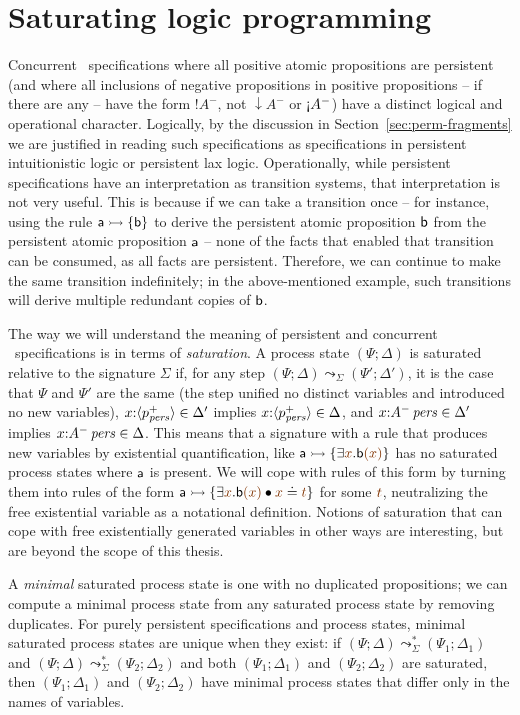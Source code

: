 \section{Saturating logic programming}

Concurrent \sls~specifications where all positive atomic propositions
are persistent (and where all inclusions of negative propositions in
positive propositions -- if there are any -- have the form ${!}A^-$, not
${\downarrow}A^-$ or ${\gnab}A^-$) have a distinct logical and
operational character. Logically, by the discussion in
Section~\ref{sec:perm-fragments} we are justified in reading such
specifications as specifications in persistent intuitionistic logic or
persistent lax logic. Operationally, while persistent specifications
have an interpretation as transition systems, that interpretation is
not very useful. This is because if we can take a transition once --
for instance, using the rule ${\sf a} \rightarrowtail \{ {\sf b} \}$ to derive
the persistent atomic proposition ${\sf b}$ from the persistent atomic
proposition ${\sf a}$ -- none of the facts that enabled that
transition can be consumed, as all facts are persistent. Therefore, we
can continue to make the same transition indefinitely; in the
above-mentioned example, such transitions will derive multiple
redundant copies of ${\sf b}$.

The way we will understand the meaning of persistent and concurrent
\sls~specifications is in terms of {\it saturation}. A process state
$(\Psi; \Delta)$ is saturated relative to the signature $\Sigma$ if,
for any step $(\Psi; \Delta) \leadsto_\Sigma (\Psi'; \Delta')$, it is
the case that $\Psi$ and $\Psi'$ are the same (the step unified no
distinct variables and introduced no new variables),
$x{:}\langle {p^+_{\it pers}} \rangle \in \Delta'$ implies $x{:}\langle {p^+_{\it pers}} \rangle \in
\Delta$, and $x{:}{A^-}\,{{\it pers}} \in \Delta'$ implies $x{:}{A^-}\,{{\it pers}}
\in \Delta$. This means that a signature with a rule that produces new
variables by existential quantification, like ${\sf a} \lefti \{
\exists \lf{x}. {\sf b}\lf{(x)} \}$ has no saturated process states
where ${\sf a}$ is present. We will cope with rules of this form by
turning them into rules of the form ${\sf a} \lefti \{ \exists
\lf{x}. {\sf b}\lf{(x)} \fuse \lf{x} \doteq \lf{t} \}$ for some
$\lf{t}$, neutralizing the free existential variable as a notational
definition. Notions of saturation that can cope with free
existentially generated variables in other ways
are interesting, but are beyond the
scope of this thesis.

A {\it minimal} saturated process state is one with no duplicated
propositions; we can compute a minimal process state from any
saturated process state by removing duplicates. For purely persistent
specifications and process states, minimal saturated process states
are unique when they exist: if $(\Psi; \Delta) \leadsto^*_\Sigma
(\Psi_1; \Delta_1)$ and $(\Psi; \Delta) \leadsto^*_\Sigma (\Psi_2;
\Delta_2)$ and both $(\Psi_1; \Delta_1)$ and $(\Psi_2; \Delta_2)$ are
saturated, then $(\Psi_1; \Delta_1)$ and $(\Psi_2; \Delta_2)$ have
minimal process states that differ only in the names of variables.

